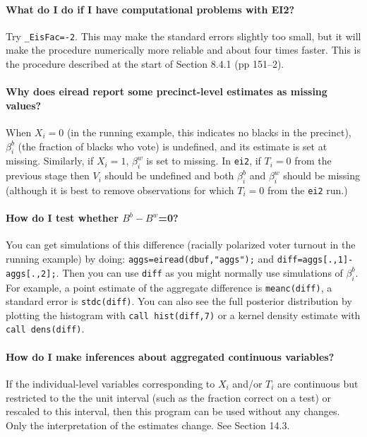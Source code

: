\documentclass[11pt,titlepage]{article}
\begin{document}
\paragraph{What do I do if I have computational problems with EI2?}
Try \texttt{\_EisFac=-2}.  This may make the standard errors slightly
too small, but it will make the procedure numerically more reliable
and about four times faster.  This is the procedure described at the
start of Section 8.4.1 (pp 151--2).

\paragraph{Why does eiread report some precinct-level estimates
  as missing values?}  When $X_i=0$ (in the running example, this
indicates no blacks in the precinct), $\beta_i^b$ (the fraction of
blacks who vote) is undefined, and its estimate is set at missing.
Similarly, if $X_i=1$, $\beta_i^w$ is set to missing.  In
\texttt{ei2}, if $T_i=0$ from the previous stage then $V_i$ should be
undefined and both $\beta_i^b$ and $\beta_i^w$ should be missing
(although it is best to remove observations for which $T_i=0$ from the
\texttt{ei2} run.)

\paragraph{How do I test whether $B^b-B^w$=0?} You can get simulations
of this difference (racially polarized voter turnout in the running
example) by doing: \texttt{aggs=eiread(dbuf,"aggs");} and
\texttt{diff=aggs[.,1]-aggs[.,2];}.  Then you can use \texttt{diff} as
you might normally use simulations of $\beta_i^b$.  For example, a
point estimate of the aggregate difference is \texttt{meanc(diff)}, a
standard error is \texttt{stdc(diff)}.  You can also see the full
posterior distribution by plotting the histogram with \texttt{call
  hist(diff,7)} or a kernel density estimate with \texttt{call
  dens(diff)}.

\paragraph{How do I make inferences about aggregated continuous variables?}
If the individual-level variables corresponding to $X_i$ and/or $T_i$
are continuous but restricted to the the unit interval (such as the
fraction correct on a test) or rescaled to this interval, then this
program can be used without any changes.  Only the interpretation of
the estimates change.  See Section 14.3.
\end{document}
